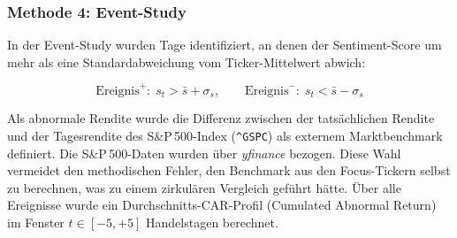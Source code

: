 \subsubsection*{Methode 4: Event-Study}

In der Event-Study wurden Tage identifiziert, an denen der Sentiment-Score um mehr als eine Standardabweichung vom Ticker-Mittelwert abwich:

\begin{equation}
\text{Ereignis}^+ : \; s_t > \bar{s} + \sigma_s, \qquad
\text{Ereignis}^- : \; s_t < \bar{s} - \sigma_s
\label{eq:event_condition}
\end{equation}

Als abnormale Rendite wurde die Differenz zwischen der tatsächlichen Rendite und der Tagesrendite des S\&P\,500-Index (\texttt{\textasciicircum GSPC}) als externem Marktbenchmark definiert. Die S\&P\,500-Daten wurden über \textit{yfinance} bezogen. Diese Wahl vermeidet den methodischen Fehler, den Benchmark aus den Focus-Tickern selbst zu berechnen, was zu einem zirkulären Vergleich geführt hätte. Über alle Ereignisse wurde ein Durchschnitts-CAR-Profil (Cumulated Abnormal Return) im Fenster $t \in [-5, +5]$ Handelstagen berechnet.
